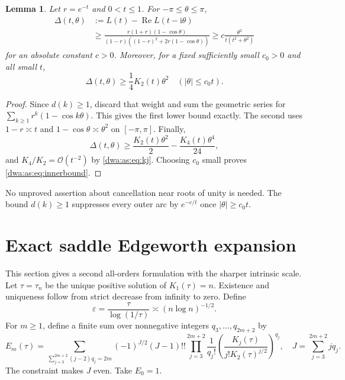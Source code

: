 \documentclass[11pt,letterpaper]{article}
\numberwithin{equation}{section}
\newtheorem{lemma}[theorem]{Lemma}
\theoremstyle{remark}
\newcommand{\ii}{\mathrm i}
\newcommand{\OO}{\mathcal O}
\DeclareMathOperator{\Repart}{Re}
\begin{document}
\begin{lemma}\label{dwa:as:lem:arcs}
Let $r=e^{-t}$ and $0<t\le1$. For $-\pi\le\theta\le\pi$,
\begin{align}
 \Delta(t,\theta)&:=L(t)-\Repart L(t-\ii\theta)\nonumber\\
 &\ge\frac{r(1+r)(1-\cos\theta)}{(1-r)((1-r)^2+2r(1-\cos\theta))}
 \ge c\frac{\theta^2}{t(t^2+\theta^2)}\label{dwa:as:eq:minor}
\end{align}
for an absolute constant $c>0$. Moreover, for a fixed sufficiently small $c_0>0$ and all small $t$,
\begin{equation}\label{dwa:as:eq:innerbound}
 \Delta(t,\theta)\ge\frac14K_2(t)\theta^2
 \quad (|\theta|\le c_0t).
\end{equation}
\end{lemma}
\begin{proof}
Since $d(k)\ge1$, discard that weight and sum the geometric series for
$\sum_{k\ge1}r^k(1-\cos k\theta)$. This gives the first lower bound exactly. The second uses $1-r\asymp t$ and $1-\cos\theta\asymp\theta^2$ on $[-\pi,\pi]$. Finally,
\[
 \Delta(t,\theta)\ge\frac{K_2(t)\theta^2}{2}
                          -\frac{K_4(t)\theta^4}{24},
\]
and $K_4/K_2=\OO(t^{-2})$ by \eqref{dwa:as:eq:kj}. Choosing $c_0$ small proves \eqref{dwa:as:eq:innerbound}.
\end{proof}
No unproved assertion about cancellation near roots of unity is needed. The bound $d(k)\ge1$ suppresses every outer arc by $e^{-c/t}$ once $|\theta|\ge c_0t$.

\section{Exact saddle Edgeworth expansion}
This section gives a second all-orders formulation with the sharper intrinsic scale. Let $\tau=\tau_n$ be the unique positive solution of $K_1(\tau)=n$. Existence and uniqueness follow from strict decrease from infinity to zero. Define
\[
 \varepsilon=\frac{\tau}{\log(1/\tau)}\asymp(n\log n)^{-1/2}.
\]
For $m\ge1$, define a finite sum over nonnegative integers $q_3,\ldots,q_{2m+2}$ by
\begin{equation}\label{dwa:as:eq:edgeworth}
 E_m(\tau)=
 \sum_{\sum_{j=3}^{2m+2}(j-2)q_j=2m}
 (-1)^{J/2}(J-1)!!
 \prod_{j=3}^{2m+2}\frac1{q_j!}
       \left(\frac{K_j(\tau)}{j!K_2(\tau)^{j/2}}\right)^{q_j},
 \quad J=\sum_{j=3}^{2m+2}jq_j.
\end{equation}
The constraint makes $J$ even. Take $E_0=1$.
\end{document}
